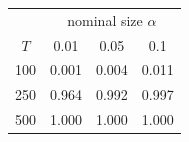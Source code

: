 % 
\begin{tabular}{cccc}
  \hline
  & \multicolumn{3}{c}{nominal size $\alpha$} \\
 $T$ & 0.01 & 0.05 & 0.1 \\
 \hline
100 & 0.001 & 0.004 & 0.011 \\ 
  250 & 0.964 & 0.992 & 0.997 \\ 
  500 & 1.000 & 1.000 & 1.000 \\ 
   \hline
\end{tabular}
